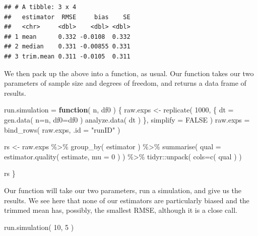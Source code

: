 \documentclass[
]{book}
\newenvironment{Shaded}{\begin{snugshade}}{\end{snugshade}}
\newcommand{\AttributeTok}[1]{\textcolor[rgb]{0.77,0.63,0.00}{#1}}
\newcommand{\ConstantTok}[1]{\textcolor[rgb]{0.00,0.00,0.00}{#1}}
\newcommand{\ControlFlowTok}[1]{\textcolor[rgb]{0.13,0.29,0.53}{\textbf{#1}}}
\newcommand{\DecValTok}[1]{\textcolor[rgb]{0.00,0.00,0.81}{#1}}
\newcommand{\FunctionTok}[1]{\textcolor[rgb]{0.00,0.00,0.00}{#1}}
\newcommand{\NormalTok}[1]{#1}
\newcommand{\OtherTok}[1]{\textcolor[rgb]{0.56,0.35,0.01}{#1}}
\newcommand{\SpecialCharTok}[1]{\textcolor[rgb]{0.00,0.00,0.00}{#1}}
\newcommand{\StringTok}[1]{\textcolor[rgb]{0.31,0.60,0.02}{#1}}
\begin{document}
\begin{verbatim}
## # A tibble: 3 x 4
##   estimator  RMSE     bias    SE
##   <chr>     <dbl>    <dbl> <dbl>
## 1 mean      0.332 -0.0108  0.332
## 2 median    0.331 -0.00855 0.331
## 3 trim.mean 0.311 -0.0105  0.311
\end{verbatim}

We then pack up the above into a function, as usual.
Our function takes our two parameters of sample size and degrees of freedom, and returns a data frame of results.

\begin{Shaded}
\begin{Highlighting}[]
\NormalTok{run.simulation }\OtherTok{=} \ControlFlowTok{function}\NormalTok{( n, df0 ) \{}
\NormalTok{    raw.exps }\OtherTok{\textless{}{-}} \FunctionTok{replicate}\NormalTok{( }\DecValTok{1000}\NormalTok{, \{}
\NormalTok{        dt }\OtherTok{=} \FunctionTok{gen.data}\NormalTok{( }\AttributeTok{n=}\NormalTok{n, }\AttributeTok{df0=}\NormalTok{df0 )}
        \FunctionTok{analyze.data}\NormalTok{( dt )}
\NormalTok{    \}, }\AttributeTok{simplify =} \ConstantTok{FALSE}\NormalTok{ )}
\NormalTok{    raw.exps }\OtherTok{=} \FunctionTok{bind\_rows}\NormalTok{( raw.exps, }\AttributeTok{.id =} \StringTok{"runID"}\NormalTok{ )}

\NormalTok{    rs }\OtherTok{\textless{}{-}}\NormalTok{ raw.exps }\SpecialCharTok{\%\textgreater{}\%}
        \FunctionTok{group\_by}\NormalTok{( estimator ) }\SpecialCharTok{\%\textgreater{}\%}
        \FunctionTok{summarise}\NormalTok{( }\AttributeTok{qual =} \FunctionTok{estimator.quality}\NormalTok{( estimate, }\AttributeTok{mu =} \DecValTok{0}\NormalTok{ ) ) }\SpecialCharTok{\%\textgreater{}\%}
\NormalTok{        tidyr}\SpecialCharTok{::}\FunctionTok{unpack}\NormalTok{( }\AttributeTok{cols=}\FunctionTok{c}\NormalTok{( qual ) )}

\NormalTok{    rs}
\NormalTok{\}}
\end{Highlighting}
\end{Shaded}

Our function will take our two parameters, run a simulation, and give us the
results. We see here that none of our estimators are particularly biased and
the trimmed mean has, possibly, the smallest RMSE, although it is a close
call.

\begin{Shaded}
\begin{Highlighting}[]
\FunctionTok{run.simulation}\NormalTok{( }\DecValTok{10}\NormalTok{, }\DecValTok{5}\NormalTok{ )}
\end{Highlighting}
\end{Shaded}
\end{document}
